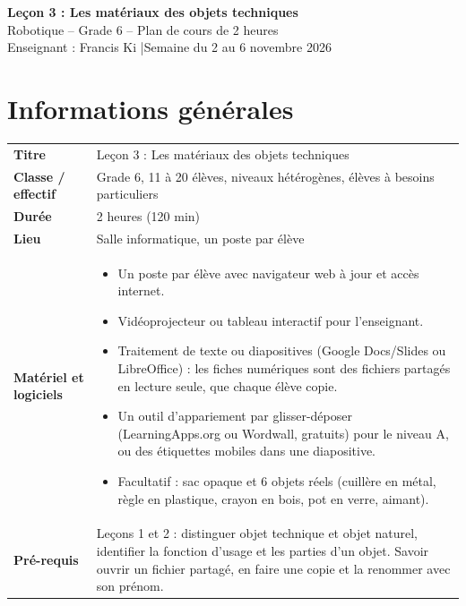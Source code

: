 \documentclass[11pt,a4paper]{article}
\begin{document}
\begin{tcolorbox}[colback=teal!10,colframe=teal!70!black,arc=2mm,boxrule=1pt]
\centering
{\LARGE\bfseries Leçon 3 : Les matériaux des objets techniques}\\[2mm]
{\large Robotique -- Grade 6 -- Plan de cours de 2 heures}\\[1mm]
Enseignant : Francis Ki \quad|\quad Semaine du 2 au 6 novembre 2026
\end{tcolorbox}

\section{Informations générales}
\begin{tabularx}{\linewidth}{>{\bfseries}p{3.6cm}Y}
\toprule
Titre & Leçon 3 : Les matériaux des objets techniques\\
Classe / effectif & Grade 6, 11 à 20 élèves, niveaux hétérogènes, élèves à besoins particuliers\\
Durée & 2 heures (120 min)\\
Lieu & Salle informatique, un poste par élève\\
Matériel et logiciels &
\begin{itemize}
 \item Un poste par élève avec navigateur web à jour et accès internet.
 \item Vidéoprojecteur ou tableau interactif pour l'enseignant.
 \item Traitement de texte ou diapositives (Google Docs/Slides ou LibreOffice) : les fiches numériques sont des fichiers partagés en lecture seule, que chaque élève copie.
 \item Un outil d'appariement par glisser-déposer (LearningApps.org ou Wordwall, gratuits) pour le niveau A, ou des étiquettes mobiles dans une diapositive.
 \item Facultatif : sac opaque et 6 objets réels (cuillère en métal, règle en plastique, crayon en bois, pot en verre, aimant).
\end{itemize}\\
Pré-requis &
Leçons 1 et 2 : distinguer objet technique et objet naturel, identifier la fonction d'usage et les parties d'un objet. Savoir ouvrir un fichier partagé, en faire une copie et la renommer avec son prénom.\\
\bottomrule
\end{tabularx}
\end{document}
